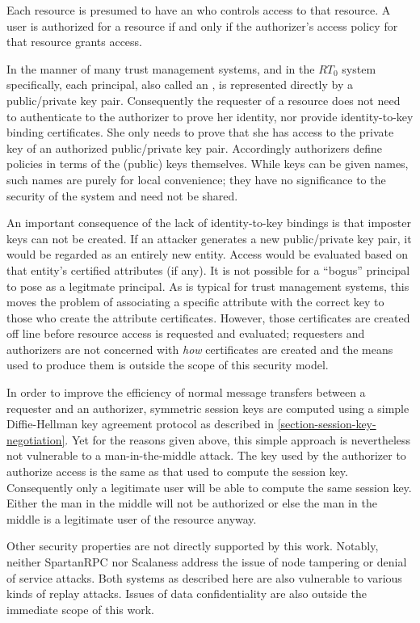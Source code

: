 Each resource is presumed to have an  who controls access to that resource.
A user is authorized for a resource if and only if the authorizer's access policy for that
resource grants access.

In the manner of many trust management systems, and in the $RT_0$ system specifically, each
principal, also called an , is represented directly by a public/private key
pair. Consequently the requester of a resource does not need to authenticate to the authorizer
to prove her identity, nor provide identity-to-key binding certificates. She only needs to prove
that she has access to the private key of an authorized public/private key pair. Accordingly
authorizers define policies in terms of the (public) keys themselves. While keys can be given
names, such names are purely for local convenience; they have no significance to the security of
the system and need not be shared.

An important consequence of the lack of identity-to-key bindings is that imposter keys can not
be created. If an attacker generates a new public/private key pair, it would be regarded as an
entirely new entity. Access would be evaluated based on that entity's certified attributes (if
any). It is not possible for a ``bogus'' principal to pose as a legitmate principal. As is
typical for trust management systems, this moves the problem of associating a specific attribute
with the correct key to those who create the attribute certificates. However, those certificates
are created off line before resource access is requested and evaluated; requesters and
authorizers are not concerned with \emph{how} certificates are created and the means used to
produce them is outside the scope of this security model.

In order to improve the efficiency of normal message transfers between a requester and an
authorizer, symmetric session keys are computed using a simple Diffie-Hellman key agreement
protocol as described in \autoref{section-session-key-negotiation}. Yet for the reasons given
above, this simple approach is nevertheless not vulnerable to a man-in-the-middle attack. The
key used by the authorizer to authorize access is the same as that used to compute the session
key. Consequently only a legitimate user will be able to compute the same session key. Either
the man in the middle will not be authorized or else the man in the middle is a legitimate user
of the resource anyway.

Other security properties are not directly supported by this work. Notably, neither SpartanRPC
nor Scalaness address the issue of node tampering or denial of service attacks. Both systems as
described here are also vulnerable to various kinds of replay attacks. Issues of data
confidentiality are also outside the immediate scope of this work.

